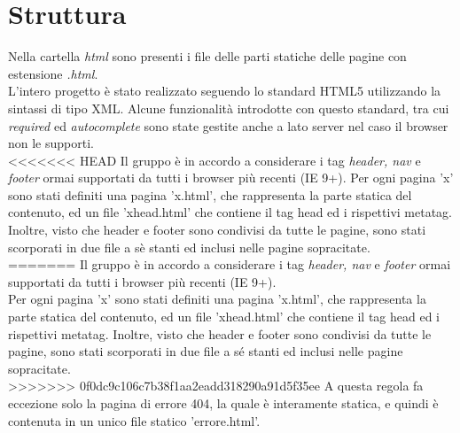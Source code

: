 \section{Struttura}
Nella cartella \textit{html} sono presenti i file delle parti statiche delle pagine con estensione \textit{.html}.\\
L'intero progetto è stato realizzato seguendo lo standard HTML5 utilizzando la sintassi di tipo XML. Alcune funzionalità introdotte con questo standard, tra cui \textit{required} ed \textit{autocomplete} sono state gestite anche a lato server nel caso il browser non le supporti.\\
<<<<<<< HEAD
Il gruppo è in accordo a considerare i tag \textit{header, nav} e \textit{footer} ormai supportati da tutti i browser più recenti (IE 9+).
Per ogni pagina 'x' sono stati definiti una pagina 'x.html', che rappresenta la parte statica del contenuto, ed un file 'x\textunderscore head.html' che contiene il tag head ed i rispettivi metatag. Inoltre, visto che header e footer sono condivisi da tutte le pagine, sono stati scorporati in due file a sè stanti ed inclusi nelle pagine sopracitate. \\
=======
Il gruppo è in accordo a considerare i tag \textit{header, nav} e \textit{footer} ormai supportati da tutti i browser più recenti (IE 9+).\\
Per ogni pagina 'x' sono stati definiti una pagina 'x.html', che rappresenta la parte statica del contenuto, ed un file 'x\textunderscore head.html' che contiene il tag head ed i rispettivi metatag. Inoltre, visto che header e footer sono condivisi da tutte le pagine, sono stati scorporati in due file a sé stanti ed inclusi nelle pagine sopracitate. \\
>>>>>>> 0f0dc9c106c7b38f1aa2eadd318290a91d5f35ee
A questa regola fa eccezione solo la pagina di errore 404, la quale è interamente statica, e quindi è contenuta in un unico file statico 'errore.html'.


\newpage